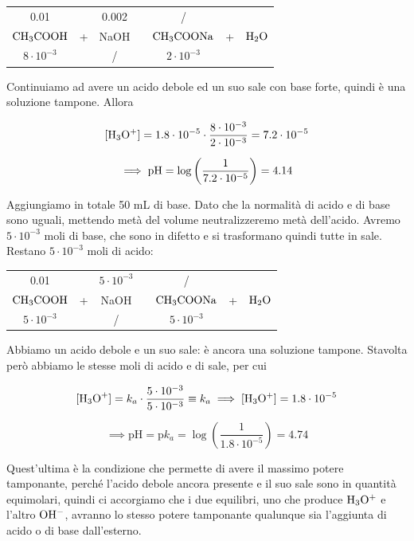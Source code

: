 \begin{center}
    \begin{tabular}{ccccccc}
        0.01 &  & 0.002  & & / & &\\
        $\rm CH_3COOH$ & + & NaOH & \ce{->} & $\rm CH_3COONa$ & + & $\rm H_2O$\\
        $8 \cdot 10^{-3}$ &  &  / & & $2 \cdot 10^{-3}$ & &\\
    \end{tabular}
\end{center}

Continuiamo ad avere un acido debole ed un suo sale con base forte, quindi è una soluzione tampone. Allora

$$\rm [H_3O^+]=1.8 \cdot 10^{-5}\cdot \frac{8 \cdot 10^{-3}}{2 \cdot 10^{-3}}=7.2 \cdot 10^{-5}$$

$$\implies \rm pH=\log\left(\frac{1}{7.2 \cdot 10^{-5}}\right)=4.14$$

Aggiungiamo in totale 50 mL di base. Dato che la normalità di acido e di base sono uguali, mettendo metà del volume neutralizzeremo metà dell'acido. Avremo $5 \cdot 10^{-3}$ moli di base, che sono in difetto e si trasformano quindi tutte in sale. Restano $5 \cdot 10^{-3}$ moli di acido:

\begin{center}
    \begin{tabular}{ccccccc}
        0.01 &  & $5 \cdot 10^{-3}$  & & / & &\\
        $\rm CH_3COOH$ & + & NaOH & \ce{->} & $\rm CH_3COONa$ & + & $\rm H_2O$\\
        $5 \cdot 10^{-3}$ &  &  / & & $5 \cdot 10^{-3}$ & &\\
    \end{tabular}
\end{center}

Abbiamo un acido debole e un suo sale: è ancora una soluzione tampone. Stavolta però abbiamo le stesse moli di acido e di sale, per cui

$$[\text{H}_3\text{O}^+]=k_a \cdot \frac{5 \cdot 10^{-3}}{5 \cdot 10^{-3}} \equiv k_a \implies \rm [H_3O^+]=1.8 \cdot 10^{-5}$$

$$\implies \text{pH}=\text{p}k_a=\log{\left(\frac{1}{1.8 \cdot 10^{-5}}\right)}=4.74$$

Quest'ultima è la condizione che permette di avere il massimo potere tamponante, perché l'acido debole ancora presente e il suo sale sono in quantità equimolari, quindi ci accorgiamo che i due equilibri, uno che produce $\rm H_3O^+$ e l'altro $\rm OH^-$, avranno lo stesso potere tamponante qualunque sia l'aggiunta di acido o di base dall'esterno.

